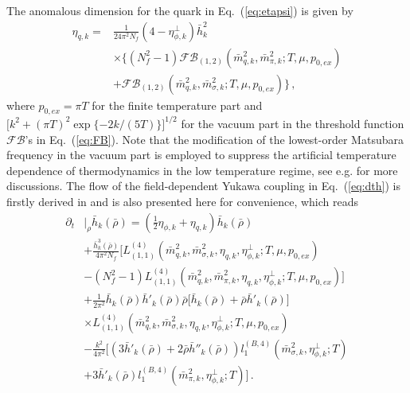 \documentclass[%
reprint,
superscriptaddress,
showpacs,preprintnumbers,
 amsmath,amssymb,
 aps,
prd,
]{revtex4-1}
\def\Eq#1{Eq.~(\ref{#1})}
\begin{document}
The anomalous dimension for the quark in \Eq{eq:etapsi} is given by
\begin{align}
\eta_{q,k}=&\frac{1}{24\pi^2N_f}(4-\eta_{\phi,k}^{\perp})\bar{h}^{2}_{k}\nonumber\\[2ex]
&\times\bigg\{ (N^{2}_{f}-1)\mathcal{FB}_{(1,2)}(\bar{m}^{2}_{q,k},\bar{m}^{2}_{\pi,k};T,\mu,p_{0,ex})\nonumber\\[2ex]
&+\mathcal{FB}_{(1,2)}(\bar{m}^{2}_{q,k},\bar{m}^{2}_{\sigma,k};T,\mu,p_{0,ex})\bigg\}\,, \label{eq:etapsi2}
\end{align} 
where $p_{0,ex}=\pi T$ for the finite temperature part and $\big[k^2+(\pi T)^2\exp\{-2k/(5 T)\}\big]^{1/2}$ for the vacuum part in the threshold function $\mathcal{FB}$'s in \Eq{eq:FB}. Note that the modification of the lowest-order Matsubara frequency in the vacuum part is employed to suppress the artificial temperature dependence of thermodynamics in the low temperature regime, see e.g. \cite{Fu:2015naa,Fu:2016tey} for more discussions. The flow of the field-dependent Yukawa coupling in \Eq{eq:dth} is firstly derived in \cite{Pawlowski:2014zaa} and is also presented here for convenience, which reads
\begin{align}
  \partial_t&\big|_{\rho}\bar{h}_k(\bar{\rho})=\left(\frac{1}{2}\eta_{\phi,k}+\eta_{q,k}\right)\bar{h}_k(\bar{\rho})\nonumber\\[2ex]
&+\frac{\bar{h}^3_k(\bar{\rho})}{4\pi^2N_f}\bigg[L^{(4)}_{(1,1)}(\bar{m}^{2}_{q,k},\bar{m}^{2}_{\sigma,k},\eta_{q,k},\eta_{\phi,k}^{\perp};T,\mu,p_{0,ex})\nonumber\\[2ex]
&-(N^{2}_{f}-1)L^{(4)}_{(1,1)}(\bar{m}^{2}_{q,k},\bar{m}^{2}_{\pi,k},\eta_{q,k},\eta_{\phi,k}^{\perp};T,\mu,p_{0,ex})\bigg]\nonumber\\[2ex]
&+\frac{1}{2\pi^2}\bar{h}_k(\bar{\rho})\bar{h}'_k(\bar{\rho})\bar{\rho}\bigg[\bar{h}_k(\bar{\rho})+\bar{\rho}\bar{h}'_k(\bar{\rho})\bigg]\nonumber\\[2ex]
&\times L^{(4)}_{(1,1)}(\bar{m}^{2}_{q,k},\bar{m}^{2}_{\sigma,k},\eta_{q,k},\eta_{\phi,k}^{\perp};T,\mu,p_{0,ex})\nonumber\\[2ex]
&-\frac{k^2}{4\pi^2}\bigg[\left(3\bar{h}'_k(\bar{\rho})+2\bar{\rho}\bar{h}''_k(\bar{\rho})\right)l^{(B,4)}_{1}(\bar{m}^{2}_{\sigma,k},\eta_{\phi,k}^{\perp};T)\nonumber\\[2ex]
&+3\bar{h}'_k(\bar{\rho})l^{(B,4)}_{1}(\bar{m}^{2}_{\pi,k},\eta_{\phi,k}^{\perp};T)\bigg]\,.\label{eq:dth2}  
\end{align} 
\end{document}
